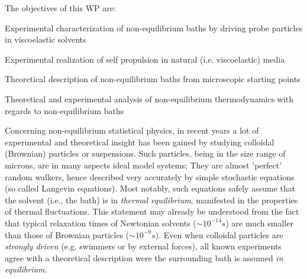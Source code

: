\begin{workpackage}[id=WPbrown,wphases=0-48,
  short=Brown. particles, %
  title=Brownian particles in nonequilibrium baths, %
  lead=USTUTT,
  USTUTTRM=72,KULRM=6,ULEIRM=6,UNIPDRM=6]

\begin{wpobjectives}
The objectives of this WP are:
\begin{compactitem}
\item Experimental characterization of non-equilibrium baths by driving probe particles in viscoelastic solvents
\item Experimental realization of self propulsion in natural (i.e. viscoelastic) media
\item Theoretical description of non-equilibrium baths from microscopic starting points
\item Theoretical and experimental analysis of non-equilibrium thermodynamics with regards to non-equilibrium baths
  \end{compactitem}
\end{wpobjectives}

\begin{wpdescription}

Concerning non-equilibrium statistical physics, in recent years a lot of experimental and
theoretical insight has been gained by studying colloidal (Brownian) particles or
suspensions. Such particles, being in the size range of microns, are in many aspects ideal
model systems; They are almost 'perfect' random walkers, hence described very accurately by
simple stochastic equations (so called Langevin equations). Most notably, such equations
safely assume that the solvent (i.e., the bath) is in {\it thermal equilibrium}, manifested
in the properties of thermal fluctuations. This statement may already be understood from the
fact that typical relaxation times of Newtonian solvents ($\sim 10^{-14} s$) are much
smaller than those of Brownian particles ($\sim 10^{-9} s$). Even when colloidal particles
are {\it strongly driven} (e.g. swimmers or by external forces), all known experiments agree
with a theoretical description were the surrounding bath is assumed {\it in equilibrium}.


\end{wpdescription}
\end{workpackage}
